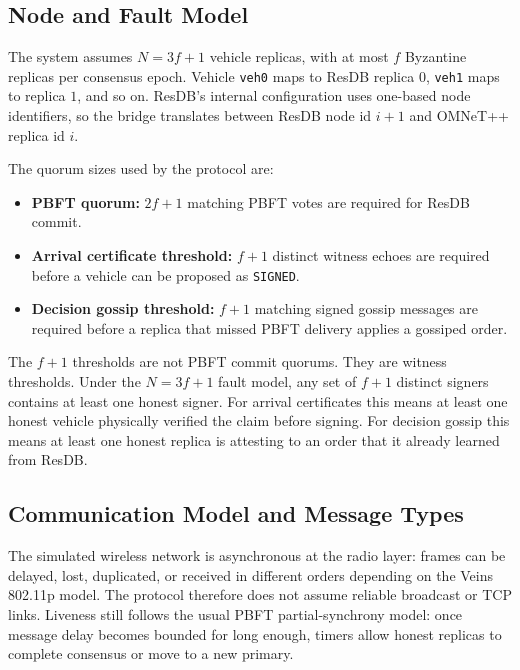 \documentclass[fleqn,10pt]{olplainarticle}
\begin{document}
\subsection{Node and Fault Model}
\label{subsec:node-fault-model}

The system assumes $N = 3f + 1$ vehicle replicas, with at most $f$ Byzantine replicas per consensus epoch. Vehicle \texttt{veh0} maps to ResDB replica $0$, \texttt{veh1} maps to replica $1$, and so on. ResDB's internal configuration uses one-based node identifiers, so the bridge translates between ResDB node id $i+1$ and OMNeT++ replica id $i$.

The quorum sizes used by the protocol are:

\begin{itemize}
    \item \textbf{PBFT quorum:} $2f+1$ matching PBFT votes are required for ResDB commit.
    \item \textbf{Arrival certificate threshold:} $f+1$ distinct witness echoes are required before a vehicle can be proposed as \texttt{SIGNED}.
    \item \textbf{Decision gossip threshold:} $f+1$ matching signed gossip messages are required before a replica that missed PBFT delivery applies a gossiped order.
\end{itemize}

The $f+1$ thresholds are not PBFT commit quorums. They are witness thresholds. Under the $N=3f+1$ fault model, any set of $f+1$ distinct signers contains at least one honest signer. For arrival certificates this means at least one honest vehicle physically verified the claim before signing. For decision gossip this means at least one honest replica is attesting to an order that it already learned from ResDB.

\subsection{Communication Model and Message Types}
\label{subsec:communication-model}

The simulated wireless network is asynchronous at the radio layer: frames can be delayed, lost, duplicated, or received in different orders depending on the Veins 802.11p model. The protocol therefore does not assume reliable broadcast or TCP links. Liveness still follows the usual PBFT partial-synchrony model: once message delay becomes bounded for long enough, timers allow honest replicas to complete consensus or move to a new primary.
\end{document}
